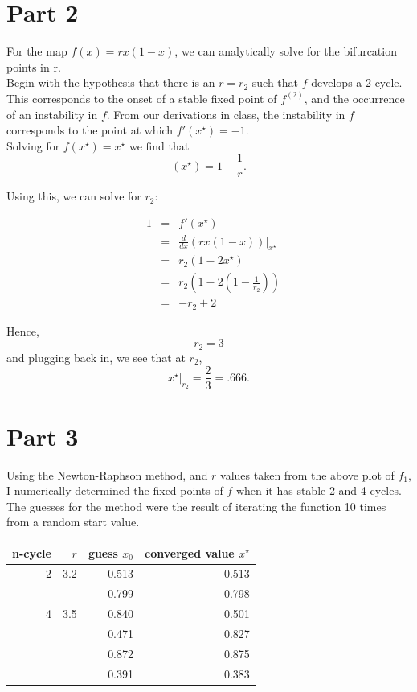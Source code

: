 \documentclass[aps,letterpaper,10pt]{article}
\begin{document}
\section{Part 2}
For the map $f(x) = rx(1-x)$, we can analytically solve for the bifurcation points in r. \\

Begin with the hypothesis that there is an $r=r_2$ such that $f$ develops a 2-cycle. This corresponds to the onset of a stable fixed point of $f^{(2)}$, and the occurrence of an instability in $f$. From our derivations in class, the instability in $f$ corresponds to the point at which $f'(x^\star)=-1$. \\

Solving for $f(x^\star) = x^\star$ we find that $$(x^\star) = 1-\frac{1}{r}.$$

\newpage
Using this, we can solve for $r_2$:

\begin{eqnarray*}
-1 & = & f'(x^\star) \\
   & = & \frac{d}{dx}(rx(1-x))|_{x^\star} \\
   & = & r_2 (1-2x^\star) \\
   & = & r_2 (1-2(1-\frac{1}{r_2})) \\
   & = & -r_2 + 2
\end{eqnarray*}

Hence, $$r_2 = 3$$
and plugging back in, we see that at $r_2$, $$x^\star |_{r_2} = \frac{2}{3} = .666.$$

\section{Part 3}

Using the Newton-Raphson method, and $r$ values taken from the above plot of $f_1$, I numerically determined the fixed points of $f$ when it has stable 2 and 4 cycles. The guesses for the method were the result of iterating the function 10 times from a random start value. \\

\begin{center}
\begin{tabular}{|r|r|r|r|}
\hline
n-cycle & $r$ & guess $x_0$ & converged value $x^\star$ \\
\hline
2 & 3.2 & 0.513 & 0.513 \\
  &     & 0.799 & 0.798 \\
\hline
4 & 3.5 & 0.840 & 0.501 \\
  &     & 0.471 & 0.827 \\
  &     & 0.872 & 0.875 \\
  &     & 0.391 & 0.383 \\
\hline
\end{tabular}
\end{center}
\end{document}
